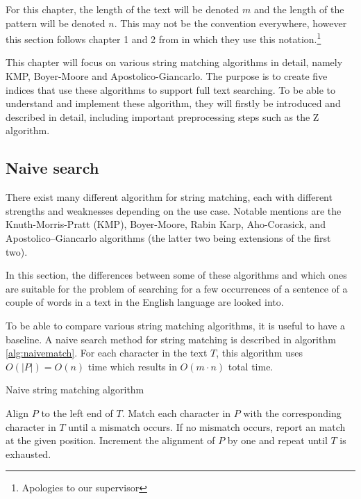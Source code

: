 For this chapter, the length of the text will be denoted $m$ and the length of the pattern will be denoted $n$. This may not be the convention everywhere, however this section follows chapter 1 and 2 from \cite{Gusfield1997AlgorithmsOS} in which they use this notation.\footnote{Apologies to our supervisor}

This chapter will focus on various string matching algorithms in detail, namely KMP, Boyer-Moore and Apostolico-Giancarlo. The purpose is to create five indices that use these algorithms to support full text searching. To be able to understand and implement these algorithm, they will firstly be introduced and described in detail, including important preprocessing steps such as the Z algorithm. 

\subsection{Naive search}

There exist many different algorithm for string matching, each with different strengths and weaknesses depending on the use case. Notable mentions are the Knuth-Morris-Pratt (KMP), Boyer-Moore, Rabin Karp, Aho-Corasick, and Apostolico–Giancarlo algorithms (the latter two being extensions of the first two). 

In this section, the differences between some of these algorithms and which ones are suitable for the problem of searching for a few occurrences of a sentence of a couple of words in a text in the English language are looked into. 

To be able to compare various string matching algorithms, it is useful to have a baseline. A naive search method for string matching is described in algorithm \ref{alg:naivematch}. For each character in the text $T$, this algorithm uses $O(|P|)=O(n)$ time which results in $O(m\cdot n)$ total time. 

\begin{algorithm}[t]
\caption{Naive string matching algorithm}\label{alg:naivematch}
\begin{algorithmic}
\State Align $P$ to the left end of $T$.
\State Match each character in $P$ with the corresponding character in $T$ until a mismatch occurs.
\State If no mismatch occurs, report an match at the given position.
\State Increment the alignment of $P$ by one and repeat until $T$ is exhausted. 
\end{algorithmic}
\end{algorithm}

